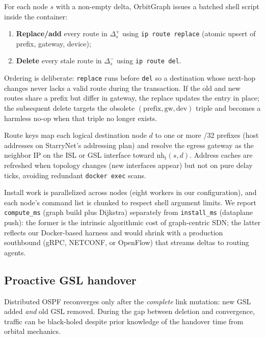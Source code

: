 For each node $s$ with a non-empty delta, OrbitGraph issues a batched shell
script inside the container:
\begin{enumerate}
  \item \textbf{Replace/add} every route in $\Delta_s^{+}$ using
        \texttt{ip route replace} (atomic upsert of prefix, gateway, device);
  \item \textbf{Delete} every stale route in $\Delta_s^{-}$ using
        \texttt{ip route del}.
\end{enumerate}
Ordering is deliberate: \texttt{replace} runs before \texttt{del} so a
destination whose next-hop changes never lacks a valid route during the
transaction.
If the old and new routes share a prefix but differ in gateway, the replace
updates the entry in place; the subsequent delete targets the obsolete
$(\text{prefix}, \text{gw}, \text{dev})$ triple and becomes a harmless no-op
when that triple no longer exists.

Route keys map each logical destination node $d$ to one or more /32 prefixes
(host addresses on StarryNet's addressing plan) and resolve the egress gateway
as the neighbor IP on the ISL or GSL interface toward $\mathrm{nh}_t(s,d)$.
Address caches are refreshed when topology changes (new interfaces appear) but
not on pure delay ticks, avoiding redundant \texttt{docker exec} scans.

Install work is parallelized across nodes (eight workers in our configuration),
and each node's command list is chunked to respect shell argument limits.
We report \texttt{compute\_ms} (graph build plus Dijkstra) separately from
\texttt{install\_ms} (dataplane push): the former is the intrinsic algorithmic
cost of graph-centric SDN; the latter reflects our Docker-based harness and
would shrink with a production southbound (gRPC, NETCONF, or OpenFlow) that
streams deltas to routing agents.

\subsection{Proactive GSL handover}
\label{sec:proactive}

Distributed OSPF reconverges only after the \emph{complete} link mutation:
new GSL added \emph{and} old GSL removed.
During the gap between deletion and convergence, traffic can be black-holed
despite prior knowledge of the handover time from orbital mechanics.

